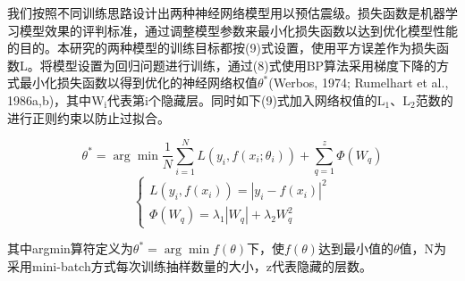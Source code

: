 \indent 我们按照不同训练思路设计出两种神经网络模型用以预估震级。损失函数是机器学习模型效果的评判标准，通过调整模型参数来最小化损失函数以达到优化模型性能的目的。本研究的两种模型的训练目标都按(9)式设置，使用平方误差作为损失函数L。将模型设置为回归问题进行训练，通过(8)式使用BP算法采用梯度下降的方式最小化损失函数以得到优化的神经网络权值$\theta^{*}$(Werbos, 1974; Rumelhart et al., 1986a,b)，其中$\mathrm{W}_{\mathrm{i}}$代表第i个隐藏层。同时如下(9)式加入网络权值的$\mathrm{L}_{1}$、$\mathrm{L}_{2}$范数的进行正则约束以防止过拟合。

\begin{equation}
\theta^{*}=\arg \min \frac{1}{N} \sum_{i=1}^{N} L\left(y_{i}, f\left(x_{i} ; \theta_{i}\right)\right)+\sum_{q=1}^{z} \Phi\left(W_{q}\right)
\end{equation}
\begin{equation}
\left\{\begin{array}{c}{L\left(y_{i}, f\left(x_{i}\right)\right)=\left|y_{i}-f\left(x_{i}\right)\right|^{2}} \\ {\Phi\left(W_{q}\right)=\lambda_{1}\left|W_{q}\right|+\lambda_{2} W_{q}^{2}}\end{array}\right.
\end{equation}

其中arg⁡min算符定义为$\theta^{*}=\arg \min f(\theta)$下，使$f(\theta)$达到最小值的$\theta$值，N为采用mini-batch方式每次训练抽样数量的大小，z代表隐藏的层数。\\
